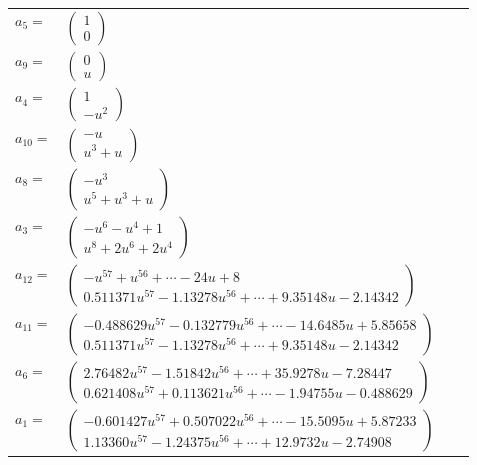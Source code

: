 \documentclass[1p]{elsarticle_modified}
\theoremstyle{definition}
\begin{document}
\begin{tabular}{m{7pt} m{180pt} m{7pt} m{180pt} }
\flushright $a_{5}=$&$\begin{pmatrix}1\\0\end{pmatrix}$ \\
\flushright $a_{9}=$&$\begin{pmatrix}0\\u\end{pmatrix}$ \\
\flushright $a_{4}=$&$\begin{pmatrix}1\\- u^2\end{pmatrix}$ \\
\flushright $a_{10}=$&$\begin{pmatrix}- u\\u^3+u\end{pmatrix}$ \\
\flushright $a_{8}=$&$\begin{pmatrix}- u^3\\u^5+u^3+u\end{pmatrix}$ \\
\flushright $a_{3}=$&$\begin{pmatrix}- u^6- u^4+1\\u^8+2 u^6+2 u^4\end{pmatrix}$ \\
\flushright $a_{12}=$&$\begin{pmatrix}- u^{57}+u^{56}+\cdots-24 u+8\\0.511371 u^{57}-1.13278 u^{56}+\cdots+9.35148 u-2.14342\end{pmatrix}$ \\
\flushright $a_{11}=$&$\begin{pmatrix}-0.488629 u^{57}-0.132779 u^{56}+\cdots-14.6485 u+5.85658\\0.511371 u^{57}-1.13278 u^{56}+\cdots+9.35148 u-2.14342\end{pmatrix}$ \\
\flushright $a_{6}=$&$\begin{pmatrix}2.76482 u^{57}-1.51842 u^{56}+\cdots+35.9278 u-7.28447\\0.621408 u^{57}+0.113621 u^{56}+\cdots-1.94755 u-0.488629\end{pmatrix}$ \\
\flushright $a_{1}=$&$\begin{pmatrix}-0.601427 u^{57}+0.507022 u^{56}+\cdots-15.5095 u+5.87233\\1.13360 u^{57}-1.24375 u^{56}+\cdots+12.9732 u-2.74908\end{pmatrix}$ \\

\end{tabular}
\end{document}
